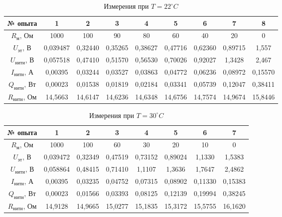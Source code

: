\documentclass[a4paper,14pt]{article}
\begin{document}
\begin{table}[H]
\caption{Измерения при $T = 22^{\circ}C$}
\label{   }
\begin{tabular}{|c|c|c|c|c|c|c|c|c|}
\hline
№ опыта    & 1        & 2       & 3       & 4       & 5       & 6       & 7       & 8       \\ \hline
$R_{\text{м}}$, Ом    & 1000     & 100     & 90      & 80      & 60      & 40      & 20      & 0       \\ \hline
$U_{\text{эт}}$, В     & 0,039487 & 0,32440 & 0,35265 & 0,38627 & 0,47716 & 0,62360 & 0,89715 & 1,557   \\ \hline
$U_{\text{нити}}$, В   & 0,057518 & 0,47410 & 0,51570 & 0,56530 & 0,70026 & 0,92027 & 1,3428  & 2,467   \\ \hline
$I_{\text{нити}}$, А   & 0,00395  & 0,03244 & 0,03527 & 0,03863 & 0,04772 & 0,06236 & 0,08972 & 0,15570 \\ \hline
$Q_{\text{нити}}$, Вт  & 0,00023  & 0,01538 & 0,01819 & 0,02184 & 0,03341 & 0,05739 & 0,12047 & 0,38411 \\ \hline
$R_{\text{нити}}$, Ом & 14,5663  & 14,6147 & 14,6236 & 14,6348 & 14,6756 & 14,7574 & 14,9674 & 15,8446 \\ \hline
\end{tabular}
\end{table}

\begin{table}[H]
\caption{Измерения при $T = 30^{\circ}C$}
\label{   }
\begin{tabular}{|c|c|c|c|c|c|c|c|}
\hline
№ опыта    & 1        & 2       & 3       & 4       & 5       & 6       & 7       \\ \hline
$R_{\text{м}}$, Ом    & 1000     & 100     & 60      & 30      & 20      & 10      & 0       \\ \hline
$U_{\text{эт}}$, В     & 0,039472 & 0,32349 & 0,47519 & 0,73152 & 0,89024 & 1,1330  & 1,5383  \\ \hline
$U_{\text{нити}}$, В   & 0,058864 & 0,48415 & 0,71410 & 1,1107  & 1,3636  & 1,7647  & 2,4862  \\ \hline
$I_{\text{нити}}$, А   & 0,00395  & 0,03235 & 0,04752 & 0,07315 & 0,08902 & 0,11330 & 0,15383 \\ \hline
$Q_{\text{нити}}$, Вт  & 0,00023  & 0,01566 & 0,03393 & 0,08125 & 0,12139 & 0,19994 & 0,38245 \\ \hline
$R_{\text{нити}}$, Ом & 14,9128  & 14,9665 & 15,0277 & 15,1835 & 15,3172 & 15,5755 & 16,1620 \\ \hline
\end{tabular}
\end{table}
\end{document}
